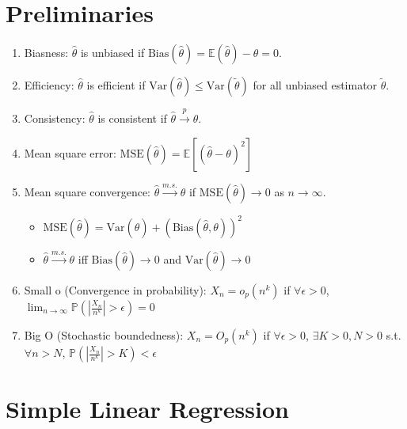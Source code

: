 \documentclass[%
 aip,
 jmp,%
 amsmath,amssymb,
 reprint,%
]{revtex4-1}
\def\e{\epsilon}
\def\th{\theta}
\def\P{\mathbb{P}}
\def\E{\mathbb{E}}
\def\Var{\mathrm{Var}}
\def\Bias{\mathrm{Bias}}
\def\MSE{\mathrm{MSE}}
\def\msto{\xrightarrow{m.s.}}
\def\pto{\overset{p}{\to}}
\begin{document}
\section{Preliminaries}
\begin{enumerate}
    \item Biasness: $\hat\theta$ is unbiased if
          $\Bias{(\hat\theta)}=\E{(\hat\theta)}-\theta=0$.

    \item Efficiency: $\hat\theta$ is efficient if
          $\Var{(\hat\theta)}\le\Var{(\tilde\theta)}$
          for all unbiased estimator $\tilde\theta$.

    \item Consistency: $\hat\th$ is consistent if $\hat\th \pto \th$.


    \item Mean square error: $\MSE (\hat\th) = \E\left[(\hat\th - \th)^2\right]$

    \item Mean square convergence: $\hat\th \msto \th$ if $\MSE (\hat\th)\to 0$ as $n\to\infty$.
        \begin{itemize}
            \item $\MSE (\hat\th) = \Var{(\hat\th)} + (\Bias{(\hat\th, \th)})^2$
            \item $\hat\th \msto \th$ iff $\Bias (\hat\th)\to 0$ and $\Var{(\hat\th)}\to 0$
        \end{itemize}

    \item Small o (Convergence in probability):
          $X_n = o_p(n^k)$ if $\forall\e>0$,$\lim_{n\to\infty} \P\left(\left\rvert\frac{X_n}{n^k}\right\rvert > \e\right)=0$

    \item Big O (Stochastic boundedness):
          $X_n = O_p(n^k)$ if $\forall\e>0$, $\exists K>0, N>0$ s.t. $\forall n>N$,
          $\P\left(\left\rvert\frac{X_n}{n^k}\right\rvert > K\right)<\e$
\end{enumerate}

\section{Simple Linear Regression}
\end{document}
